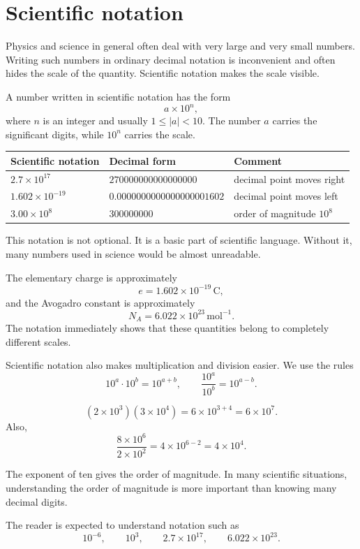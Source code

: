 \section{Scientific notation}

Physics and science in general often deal with very large and very small numbers. Writing such numbers in ordinary decimal notation is inconvenient and often hides the scale of the quantity. Scientific notation makes the scale visible.

\begin{definitionbox}
A number written in scientific notation has the form
\[
a \times 10^n,
\]
where \(n\) is an integer and usually \(1 \leq |a| < 10\). The number \(a\) carries the significant digits, while \(10^n\) carries the scale.
\end{definitionbox}

\begin{center}
\begin{tabular}{@{}lll@{}}
\toprule
Scientific notation & Decimal form & Comment \\
\midrule
\(2.7\times 10^{17}\) & \(270000000000000000\) & decimal point moves right \\
\(1.602\times 10^{-19}\) & \(0.0000000000000000001602\) & decimal point moves left \\
\(3.00\times 10^8\) & \(300000000\) & order of magnitude \(10^8\) \\
\bottomrule
\end{tabular}
\end{center}

This notation is not optional. It is a basic part of scientific language. Without it, many numbers used in science would be almost unreadable.

The elementary charge is approximately
\[
e = 1.602 \times 10^{-19}\,\mathrm{C},
\]
and the Avogadro constant is approximately
\[
N_A = 6.022 \times 10^{23}\,\mathrm{mol}^{-1}.
\]
The notation immediately shows that these quantities belong to completely different scales.

Scientific notation also makes multiplication and division easier. We use the rules
\[
10^a \cdot 10^b = 10^{a+b},
\qquad
\frac{10^a}{10^b} = 10^{a-b}.
\]

\begin{examplebox}
\[
(2 \times 10^3)(3 \times 10^4)
= 6 \times 10^{3+4}
= 6 \times 10^7.
\]
Also,
\[
\frac{8 \times 10^6}{2 \times 10^2}
= 4 \times 10^{6-2}
= 4 \times 10^4.
\]
\end{examplebox}

\begin{remarkbox}
The exponent of ten gives the order of magnitude. In many scientific situations, understanding the order of magnitude is more important than knowing many decimal digits.
\end{remarkbox}

The reader is expected to understand notation such as
\[
10^{-6}, \qquad 10^3, \qquad 2.7 \times 10^{17}, \qquad 6.022 \times 10^{23}.
\]
